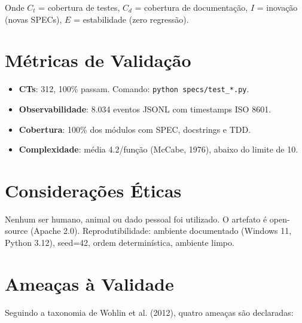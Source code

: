 Onde $C_t$ = cobertura de testes, $C_d$ = cobertura de documentação, $I$ = inovação (novas SPECs), $E$ = estabilidade (zero regressão).

\section{Métricas de Validação}

\begin{itemize}
    \item \textbf{CTs}: 312, 100\% passam. Comando: \texttt{python specs/test\_*.py}.
    \item \textbf{Observabilidade}: 8.034 eventos JSONL com timestamps ISO 8601.
    \item \textbf{Cobertura}: 100\% dos módulos com SPEC, docstrings e TDD.
    \item \textbf{Complexidade}: média 4.2/função (McCabe, 1976), abaixo do limite de 10.
\end{itemize}

\section{Considerações Éticas}

Nenhum ser humano, animal ou dado pessoal foi utilizado. O artefato é open-source (Apache 2.0). Reprodutibilidade: ambiente documentado (Windows 11, Python 3.12), seed=42, ordem determinística, ambiente limpo.

\section{Ameaças à Validade}

Seguindo a taxonomia de Wohlin et al. (2012), quatro ameaças são declaradas:

